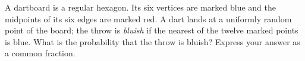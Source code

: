 A dartboard is a regular hexagon. Its six vertices are marked blue and the midpoints of its six edges are marked red. A dart lands at a uniformly random point of the board; the throw is \emph{bluish} if the nearest of the twelve marked points is blue. What is the probability that the throw is bluish? Express your answer as a common fraction.
